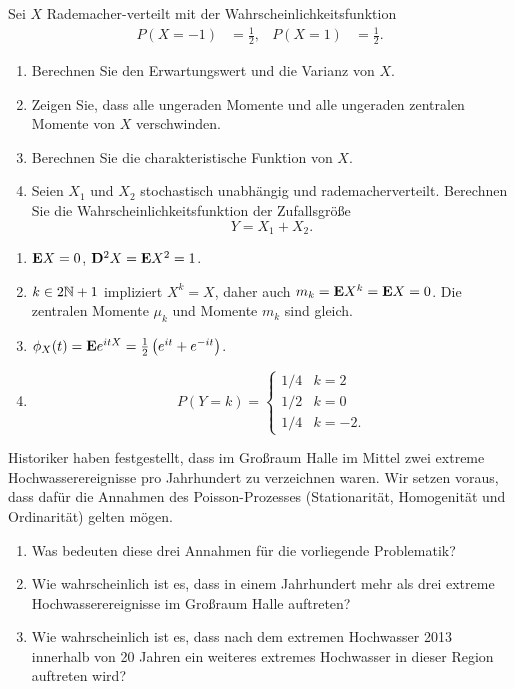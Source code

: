  Sei $X$ Rademacher-verteilt mit der
Wahrscheinlichkeitsfunktion
\begin{align*}
    P(X=-1) &= \frac{1}{2}, & P(X=1)& = \frac{1}{2}.
\end{align*}
\begin{enumerate}
    \item Berechnen Sie den Erwartungswert und die Varianz von $X$. 

    \item Zeigen Sie, dass alle ungeraden Momente und alle ungeraden zentralen
        Momente von $X$ verschwinden. 

    \item Berechnen Sie die charakteristische Funktion von $X$. 

    \item Seien $X_1$ und $X_2$ stochastisch unabhängig und rademacherverteilt.
        Berechnen Sie die Wahrscheinlichkeitsfunktion der Zufallsgröße
        \begin{equation*}
            Y = X_1 + X_2.
        \end{equation*}
\end{enumerate}

\solution
\begin{enumerate}
    \item $\mathbf E X= 0$, $\mathbf D^2 X = \mathbf E X^2 = 1$.
    \item $k\in 2\mathbb N+1$ impliziert $X^k= X$, daher auch $m_{k} = \mathbf E X^k = \mathbf E
        X=0$. Die zentralen Momente $\mu_k$ und Momente $m_{k}$ sind gleich. 
    \item $\phi_{X}(t) = \mathbf E e^{i t X} = \frac{1}{2} \left(  e^{it} + e^{-it} \right)$.
    \item \begin{equation*}
            P(Y=k) =
            \begin{cases}
                1/4 & k=2 \\
                1/2 & k=0 \\
                1/4 & k=-2.
            \end{cases}
        \end{equation*}
\end{enumerate}

 Historiker haben festgestellt, dass im
Großraum Halle im Mittel zwei extreme Hochwasserereignisse pro Jahrhundert zu
verzeichnen waren. Wir setzen voraus, dass dafür die Annahmen des
Poisson-Prozesses (Stationarität, Homogenität und Ordinarität) gelten mögen.
\begin{enumerate}
    \item Was bedeuten diese drei Annahmen für die vorliegende Problematik?
    \item Wie wahrscheinlich ist es, dass in einem Jahrhundert mehr als drei
        extreme Hochwasserereignisse im Großraum Halle auftreten?
    \item Wie wahrscheinlich ist es, dass nach dem extremen Hochwasser 2013
        innerhalb von 20 Jahren ein weiteres extremes Hochwasser in dieser
        Region auftreten wird?  
\end{enumerate}

